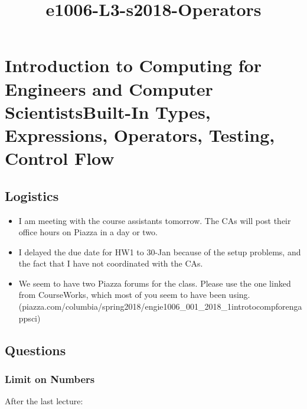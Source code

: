 \documentclass[11pt]{article}
\title{e1006-L3-s2018-Operators}
\begin{document}
    
    
    \maketitle
    
    

    
    \section{Introduction to Computing for Engineers and Computer
ScientistsBuilt-In Types, Expressions, Operators, Testing, Control
Flow}\label{introduction-to-computing-for-engineers-and-computer-scientistsbuilt-in-types-expressions-operators-testing-control-flow}

    \subsection{Logistics}\label{logistics}

\begin{itemize}
\item
  I am meeting with the course assistants tomorrow. The CAs will post
  their office hours on Piazza in a day or two.
\item
  I delayed the due date for HW1 to 30-Jan because of the setup
  problems, and the fact that I have not coordinated with the CAs.
\item
  We seem to have two Piazza forums for the class. Please use the one
  linked from CourseWorks, which most of you seem to have been using.
  (piazza.com/columbia/spring2018/engie1006\_001\_2018\_1introtocompforengappsci)
\end{itemize}

    \subsection{Questions}\label{questions}

\subsubsection{Limit on Numbers}\label{limit-on-numbers}

After the last lecture:
\end{document}
